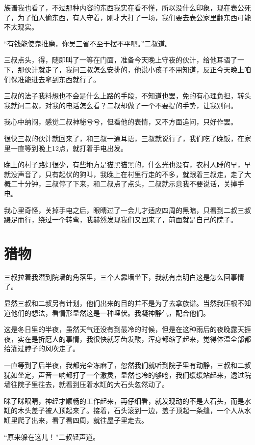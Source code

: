 族谱我也看了，不过那种内容的东西我实在看不懂，所以没什么印象，现在表公死了，为了怕人偷东西，有人守着，刚才大打了一场，我们要去表公家里翻东西可能不太现实。

“有钱能使鬼推磨，你吴三省不至于摆不平吧。”二叔道。

三叔点头，得，随即叫了一等在门面，准备今天晚上守夜的伙计，给他耳语了一下，那伙计就走了，我问三叔怎么安排的，他说小孩子不用知道，反正今天晚上咱们保准能进去拿到东西就行了。

三叔的法子我料想也不会是什么上路的手段，不知道也罢，免的有心理负担，转头我就问二叔，对我的电话怎么看？二叔却做了一个不要提的手势，让我别问。

我心中纳闷，感觉二叔神秘兮兮，但看他的表情，又不方面追问，只好作罢。

很快三叔的伙计就回来了，和三叔一通耳语，三叔就说行了，我们吃了晚饭，在家里一直等到晚上12点，就打着手电出发。

晚上的村子路灯很少，有些地方是猫黑猫黑的，什么光也没有，农村人睡的早，早就没声音了，只有起伏的狗叫，我晚上在村里行走的不多，就跟着三叔走，走了大概二十分钟，三叔停了下来，和二叔点了点头，二叔就示意我不要说话，关掉手电。

我心里奇怪，关掉手电之后，眼睛过了一会儿才适应四周的黑暗，只看到二叔三叔蹑足而行，绕过一个转弯，我赫然发现我们又回来了，前面就是自己的院子。

\chapter{猎物}

三叔拉着我潜到院墙的角落里，三个人靠墙坐下，我就有点明白这是怎么回事情了。

显然三叔和二叔另有计划，他们出来的目的并不是为了去拿族谱。当然我压根不知道他们的想法，看情形显然这是一种埋伏。我凝神静气，配合他们。

这是冬日里的半夜，虽然天气还没有到最冷的时候，但是在这种雨后的夜晚露天捱夜，实在是折磨人的事情，我很快就牙齿发酸，浑身都缩了起来，觉得体温全部都给灌过脖子的风吹走了。

一直等到了后半夜，我都完全冻麻了，忽然我们就听到院子里有动静，三叔和二叔犹如坐定，声音一响都打了一个激灵，显然也冷的够呛，我们缓缓站起来，透过院墙往院子里往去，就看到压着水缸的大石头忽然动了。

眯了眯眼睛，神经才顺畅的工作起来，再仔细看，就发现动的不是大石头，而是水缸的木头盖子被人顶起来了。接着，石头滚到一边，盖子顶起一条缝，一个人从水缸里爬了出来，看了看四周，就往屋子里走去。

“原来躲在这儿！”二叔轻声道。

